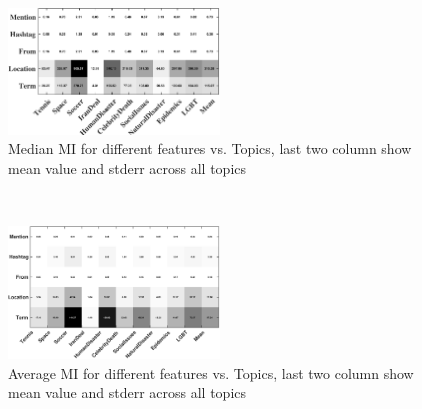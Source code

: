 \begin{figure}[h!]
\centering
\includegraphics[width=0.5\textwidth]{images/medianMI.pdf}
\vspace{-3mm}
\caption{Median MI for different features vs. Topics, last two column show mean value and stderr across all topics}
\label{fig:table1}
\end{figure}
\
\begin{figure}[h!]
\centering
\includegraphics[width=0.5\textwidth]{images/avgMI_gray.pdf}
\vspace{-3mm}
\caption{Average MI for different features vs. Topics, last two column show mean value and stderr across all topics}
\label{fig:table1}
\end{figure}

